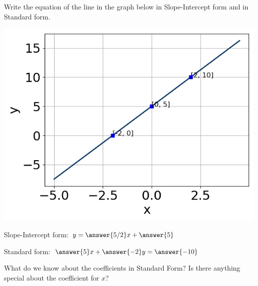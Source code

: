 \documentclass{ximera}
\begin{document}
\begin{question}
Write the equation of the line in the graph below in Slope-Intercept form and in Standard form. 

\includegraphics[scale=0.5]{question3.png}

Slope-Intercept form: $y = \answer{5/2}x + \answer{5}$

Standard form: $\answer{5} x + \answer{-2} y = \answer{-10}$

\begin{hint}
	What do we know about the coefficients in Standard Form? Is there anything special about the coefficient for $x$?
\end{hint}
\end{question}
\end{document}
